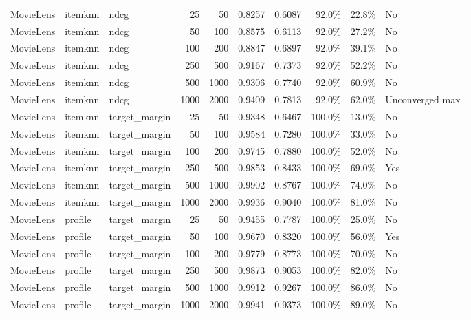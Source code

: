 \begin{longtable}{@{}p{}p{}p{}rrrrrrp{}@{}}
MovieLens & itemknn & ndcg & 25 & 50 & 0.8257 & 0.6087 & 92.0\% & 22.8\% & No \\
MovieLens & itemknn & ndcg & 50 & 100 & 0.8575 & 0.6113 & 92.0\% & 27.2\% & No \\
MovieLens & itemknn & ndcg & 100 & 200 & 0.8847 & 0.6897 & 92.0\% & 39.1\% & No \\
MovieLens & itemknn & ndcg & 250 & 500 & 0.9167 & 0.7373 & 92.0\% & 52.2\% & No \\
MovieLens & itemknn & ndcg & 500 & 1000 & 0.9306 & 0.7740 & 92.0\% & 60.9\% & No \\
MovieLens & itemknn & ndcg & 1000 & 2000 & 0.9409 & 0.7813 & 92.0\% & 62.0\% & Unconverged max \\
MovieLens & itemknn & target\_margin & 25 & 50 & 0.9348 & 0.6467 & 100.0\% & 13.0\% & No \\
MovieLens & itemknn & target\_margin & 50 & 100 & 0.9584 & 0.7280 & 100.0\% & 33.0\% & No \\
MovieLens & itemknn & target\_margin & 100 & 200 & 0.9745 & 0.7880 & 100.0\% & 52.0\% & No \\
MovieLens & itemknn & target\_margin & 250 & 500 & 0.9853 & 0.8433 & 100.0\% & 69.0\% & Yes \\
MovieLens & itemknn & target\_margin & 500 & 1000 & 0.9902 & 0.8767 & 100.0\% & 74.0\% & No \\
MovieLens & itemknn & target\_margin & 1000 & 2000 & 0.9936 & 0.9040 & 100.0\% & 81.0\% & No \\
MovieLens & profile & target\_margin & 25 & 50 & 0.9455 & 0.7787 & 100.0\% & 25.0\% & No \\
MovieLens & profile & target\_margin & 50 & 100 & 0.9670 & 0.8320 & 100.0\% & 56.0\% & Yes \\
MovieLens & profile & target\_margin & 100 & 200 & 0.9779 & 0.8773 & 100.0\% & 70.0\% & No \\
MovieLens & profile & target\_margin & 250 & 500 & 0.9873 & 0.9053 & 100.0\% & 82.0\% & No \\
MovieLens & profile & target\_margin & 500 & 1000 & 0.9912 & 0.9267 & 100.0\% & 86.0\% & No \\
MovieLens & profile & target\_margin & 1000 & 2000 & 0.9941 & 0.9373 & 100.0\% & 89.0\% & No \\
\end{longtable}
